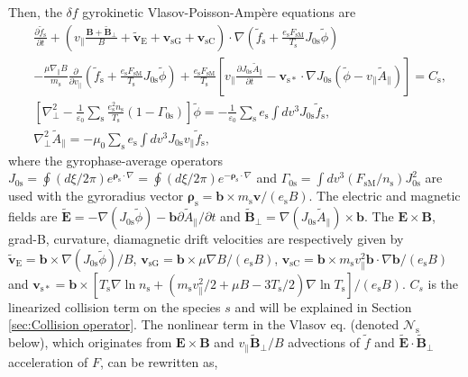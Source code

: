 Then, the $\delta f$ gyrokinetic Vlasov-Poisson-Amp\`{e}re equations are
\begin{align}
  &\frac{\partial \tilde{f}_\mathrm{s}}{\partial t} + \left( v_\parallel \frac{\bm{B} + \tilde{\bm{B}}_\perp}{B} + \tilde{\bm{v}}_\mathrm{E} + \bm{v}_\mathrm{sG} + \bm{v}_\mathrm{sC} \right) \cdot \nabla \left( \tilde{f}_\mathrm{s} + \frac{e_\mathrm{s} F_\mathrm{sM}}{T_\mathrm{s}} J_{0\mathrm{s}} \tilde{\phi} \right) \nonumber \\
  &- \frac{\mu \nabla_\parallel B}{m_\mathrm{s}} \frac{\partial}{\partial v_\parallel} \left( \tilde{f}_\mathrm{s} + \frac{e_\mathrm{s} F_\mathrm{sM}}{T_\mathrm{s}} J_{0\mathrm{s}} \tilde{\phi} \right) + \frac{e_\mathrm{s} F_\mathrm{sM}}{T_\mathrm{s}} \left[ v_\parallel \frac{\partial J_{0\mathrm{s}} \tilde{A}_\parallel}{\partial t} - \bm{v}_{\mathrm{s}*} \cdot \nabla J_{0\mathrm{s}} (\tilde{\phi} - v_\parallel \tilde{A}_\parallel) \right] = C_\mathrm{s}, 
  \label{eq:vlasovinreal}\\
  &\left[ \nabla_\perp^2 - \frac{1}{\varepsilon_0} \sum_\mathrm{s} \frac{e_\mathrm{s}^2 n_\mathrm{s}}{T_\mathrm{s}} \left( 1 - \Gamma_{0\mathrm{s}} \right) \right] \tilde{\phi} = - \frac{1}{\varepsilon_0} \sum_\mathrm{s} e_\mathrm{s} \int dv^3 J_{0\mathrm{s}} \tilde{f}_\mathrm{s},
  \label{eq:poissoninreal} \\
  &\nabla_\perp^2 \tilde{A}_\parallel = - \mu_0 \sum_\mathrm{s} e_\mathrm{s} \int dv^3 J_{0\mathrm{s}} v_\parallel \tilde{f}_\mathrm{s},
  \label{eq:ampereinreal}
\end{align}
where the gyrophase-average operators $J_{0\mathrm{s}} = \oint (d\xi/2\pi) e^{\bm{\rho}_\mathrm{s} \cdot \nabla} = \oint (d\xi/2\pi) e^{-\bm{\rho}_\mathrm{s} \cdot \nabla}$ and $\Gamma_{0\mathrm{s}} = \int dv^3 (F_\mathrm{sM}/n_\mathrm{s}) J^2_{0\mathrm{s}}$ are used with the gyroradius vector $\bm{\rho}_\mathrm{s} = \bm{b} \times m_\mathrm{s} \bm{v} / (e_\mathrm{s}B)$. The electric and magnetic fields are $\tilde{\bm{E}} = - \nabla (J_{0\mathrm{s}} \tilde{\phi}) - \bm{b} \partial \tilde{A}_\parallel /\partial t$ and $\tilde{\bm{B}}_\perp = \nabla (J_{0\mathrm{s}} \tilde{A}_\parallel) \times \bm{b}$. The $\bm{E} \times \bm{B}$, grad-B, curvature, diamagnetic drift velocities are respectively given by $\tilde{\bm{v}}_\mathrm{E} = \bm{b} \times \nabla (J_{0\mathrm{s}} \tilde{\phi})/B$, $\bm{v}_\mathrm{sG} = \bm{b} \times \mu \nabla B/(e_\mathrm{s}B)$, $\bm{v}_\mathrm{sC} = \bm{b} \times m_\mathrm{s} v_\parallel^2 \bm{b} \cdot \nabla \bm{b}/(e_\mathrm{s}B)$ and $\bm{v}_{\mathrm{s}*} = \bm{b} \times [T_\mathrm{s} \nabla \ln n_\mathrm{s} + ( m_\mathrm{s} v_\parallel^2 /2+ \mu B - 3 T_\mathrm{s}/2) \nabla \ln T_\mathrm{s} ] /(e_\mathrm{s}B)$. $C_s$ is the linearized collision term on the species $s$ and will be explained in Section \ref{sec:Collision operator}. The nonlinear term in the Vlasov eq.  (denoted $\mathcal{N}_\mathrm{s}$ below), which originates from $\bm{E} \times \bm{B}$ and $v_\parallel \tilde{\bm{B}}_\perp/B$ advections of $\tilde{f}$ and $\tilde{\bm{E}} \cdot \tilde{\bm{B}}_\perp$ acceleration of $F$, can be rewritten as,
